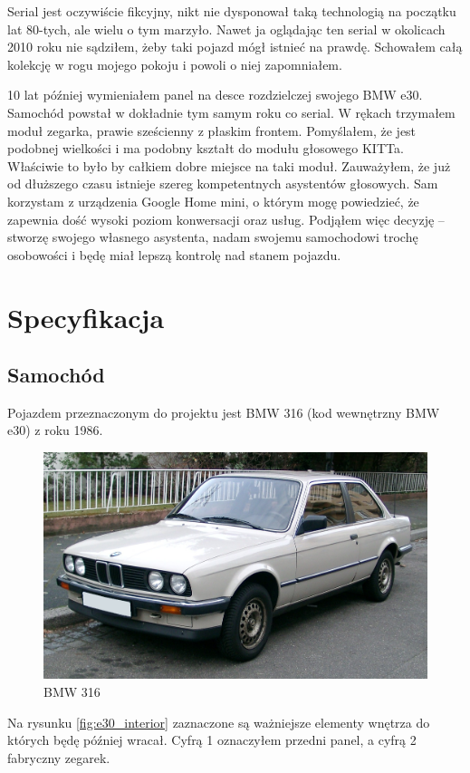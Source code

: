 \documentclass[declaration,shortabstract, inz]{iithesis}
\begin{document}
Serial jest oczywiście fikcyjny, nikt nie dysponował taką technologią na początku lat 80-tych, ale wielu o tym marzyło. Nawet ja oglądając ten serial w okolicach 2010 roku nie sądziłem, żeby taki pojazd mógł istnieć na prawdę. Schowałem całą kolekcję w rogu mojego pokoju i powoli o niej zapomniałem.

10 lat później wymieniałem panel na desce rozdzielczej swojego BMW e30. Samochód powstał w dokładnie tym samym roku co serial. W rękach trzymałem moduł zegarka, prawie sześcienny z płaskim frontem. Pomyślałem, że jest podobnej wielkości i ma podobny kształt do modułu głosowego KITTa. Właściwie to było by całkiem dobre miejsce na taki moduł. Zauważyłem, że już od dłuższego czasu istnieje szereg kompetentnych asystentów głosowych. Sam korzystam z urządzenia Google Home mini, o którym mogę powiedzieć, że zapewnia dość wysoki poziom konwersacji oraz usług. Podjąłem więc decyzję -- stworzę swojego własnego asystenta, nadam swojemu samochodowi trochę osobowości i będę miał lepszą kontrolę nad stanem pojazdu.

\chapter{Specyfikacja}
\section{Samochód}
Pojazdem przeznaczonym do projektu jest BMW 316 (kod wewnętrzny BMW e30) z roku 1986.

\begin{figure}[htp]
    \centering
    \includegraphics[width=12cm]{images/bmw_e30_front.jpg}
    \caption{BMW 316}
    \label{fig:e30_front}
\end{figure}

Na rysunku \ref{fig:e30_interior} zaznaczone są ważniejsze elementy wnętrza do których będę później wracał. Cyfrą 1 oznaczyłem przedni panel, a cyfrą 2 fabryczny zegarek.
\end{document}
